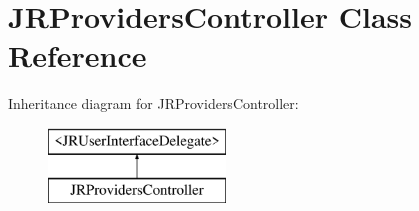 \hypertarget{interface_j_r_providers_controller}{
\section{JRProvidersController Class Reference}
\label{interface_j_r_providers_controller}
}
Inheritance diagram for JRProvidersController:\begin{figure}[H]
\begin{center}
\leavevmode
\includegraphics[height=2.000000cm]{interface_j_r_providers_controller}
\end{center}
\end{figure}
